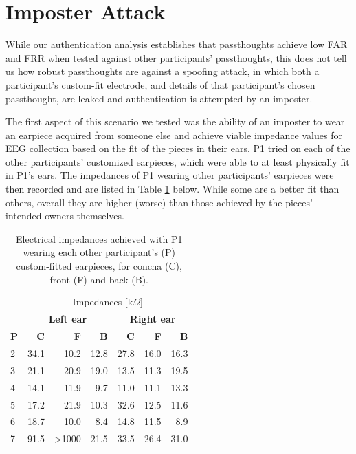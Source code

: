 \documentclass{sigchi}
\begin{document}
\section{Imposter Attack}

While our authentication analysis establishes that passthoughts achieve low FAR and FRR when tested against other participants' passthoughts, this does not tell us how robust passthoughts are against a spoofing attack, in which both a participant's custom-fit electrode, and details of that participant's chosen passthought, are leaked and authentication is attempted by an imposter. 

The first aspect of this scenario we tested was the ability of an imposter to wear an earpiece acquired from someone else and achieve viable impedance values for EEG collection based on the fit of the pieces in their ears. P1 tried on each of the other participants' customized earpieces, which were able to at least physically fit in P1's ears. The impedances of P1 wearing other participants' earpieces were then recorded and are listed in Table \ref{tab:imposter_impedances} below. While some are a better fit than others, overall they are higher (worse) than those achieved by the pieces' intended owners themselves.

\begin{table}[h]
\begin{center}
\begin{tabular}{lrrrrrr}
& \multicolumn{6}{c}{Impedances [k\(\Omega\)]} \\
\cline{2-7}
& \multicolumn{3}{|c|}{\textbf{Left ear}} & \multicolumn{3}{c|}{\textbf{Right ear}} \\
\textbf{P} & \textbf{C} & \textbf{F} & \textbf{B} & \textbf{C} & \textbf{F} & \textbf{B} \\
\hline
2 & 34.1 & 10.2 & 12.8 & 27.8 & 16.0 & 16.3\\
3 & 21.1 & 20.9 & 19.0 & 13.5 & 11.3 & 19.5\\
4 & 14.1 & 11.9 & 9.7 & 11.0 & 11.1 & 13.3\\
5 & 17.2 & 21.9 & 10.3 & 32.6 & 12.5 & 11.6\\
6 & 18.7 & 10.0 & 8.4 & 14.8 & 11.5 & 8.9\\
7 & 91.5 & \textgreater1000 & 21.5 & 33.5 & 26.4 & 31.0\\
\end{tabular}
\end{center}
\caption{Electrical impedances achieved with P1 wearing each other participant's (P) custom-fitted earpieces, for concha (C), front (F) and back (B).}
\label{tab:imposter_impedances}
\end{table}
\end{document}
